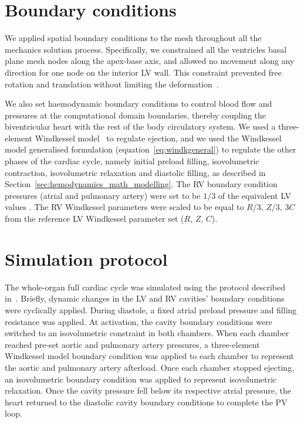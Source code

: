%
%
%
\section{Boundary conditions}\label{sec:ch2boundaryconditions}
We applied spatial boundary conditions to the mesh throughout all the mechanics solution process. Specifically, we constrained all the ventricles basal plane mesh nodes along the apex-base axis, and allowed no movement along any direction for one node on the interior LV wall. This constraint prevented free rotation and translation without limiting the deformation~\cite{Land:2012}.

\vspace{0.2cm}
We also set haemodynamic boundary conditions to control blood flow and pressures at the computational domain boundaries, thereby coupling the biventricular heart with the rest of the body circulatory system. We used a three-element Windkessel model~\cite{Westerhof:1971} to regulate ejection, and we used the Windkessel model generalised formulation (equation~\eqref{eq:windkgeneral}) to regulate the other phases of the cardiac cycle, namely initial preload filling, isovolumetric contraction, isovolumetric relaxation and diastolic filling, as described in Section~\ref{sec:hemodynamics_math_modelling}. The RV boundary condition pressures (atrial and pulmonary artery) were set to be $1/3$ of the equivalent LV values . The RV Windkessel parameters were scaled to be equal to $R/3$, $Z/3$, $3C$ from the reference LV Windkessel parameter set ($R$, $Z$, $C$).


%
%
%
\section{Simulation protocol}\label{sec:ch2simulationprotocol}
The whole-organ full cardiac cycle was simulated using the protocol described in~\cite{Land:2012, Land:2012*a, Land:2015}. Briefly, dynamic changes in the LV and RV cavities' boundary conditions were cyclically applied. During diastole, a fixed atrial preload pressure and filling resistance was applied. At activation, the cavity boundary conditions were switched to an isovolumetric constraint in both chambers. When each chamber reached pre-set aortic and pulmonary artery pressures, a three-element Windkessel model boundary condition was applied to each chamber to represent the aortic and pulmonary artery afterload. Once each chamber stopped ejecting, an isovolumetric boundary condition was applied to represent isovolumetric relaxation. Once the cavity pressure fell below its respective atrial pressure, the heart returned to the diastolic cavity boundary conditions to complete the PV loop.


